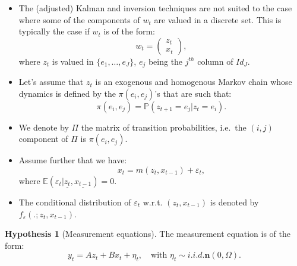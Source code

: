 \documentclass[
  12pt,
]{book}
\providecommand{\tightlist}{%
  \setlength{\itemsep}{0pt}\setlength{\parskip}{0pt}}
\theoremstyle{definition}
\theoremstyle{definition}
\theoremstyle{definition}
\theoremstyle{definition}
\newtheorem{hypothesis}{Hypothesis}[chapter]
\theoremstyle{remark}
\begin{document}
\begin{itemize}
\tightlist
\item
  The (adjusted) Kalman and inversion techniques are not suited to the case where some of the components of \(w_t\) are valued in a discrete set. This is typically the case if \(w_t\) is of the form:
  \[
  w_t = \left(\begin{array}{c}
  z_t \\
  x_t
  \end{array}\right),
  \]
  where \(z_t\) is valued in \(\{e_1,\dots,e_J\}\), \(e_j\) being the \(j^{th}\) column of \(Id_J\).
\item
  Let's assume that \(z_t\) is an exogenous and homogenous Markov chain whose dynamics is defined by the \(\pi(e_i,e_j)\)'s that are such that:
  \begin{equation}
  \pi(e_i, e_j) = \mathbb{P}(z_{t+1}=e_j | z_t=e_i).\label{eq:transitproba}
  \end{equation}
\item
  We denote by \(\Pi\) the matrix of transition probabilities, i.e.~the \((i,j)\) component of \(\Pi\) is \(\pi(e_i, e_j)\).
\item
  Assume further that we have:
  \begin{equation}
  x_t = m(z_t,x_{t-1}) + \varepsilon_t,\label{eq:dynxRS}
  \end{equation}
  where \(\mathbb{E}(\varepsilon_t|\underline{z_t},\underline{x_{t-1}})=0\).
\item
  The conditional distribution of \(\varepsilon_t\) w.r.t. \((z_t,x_{t-1})\) is denoted by \(f_{\varepsilon}(.;z_t,x_{t-1})\).
\end{itemize}

\begin{hypothesis}[Measurement equations]
\protect\hypertarget{hyp:RSmeasurement}{}\label{hyp:RSmeasurement}The measurement equation is of the form:
\begin{equation}
y_t = A z_t + B x_t + \eta_t,  \quad \mbox{with }  \eta_t \sim i.i.d. \mathbf{n}(0,\Omega).\label{eq:RSmeasur}
\end{equation}
\end{hypothesis}
\end{document}
